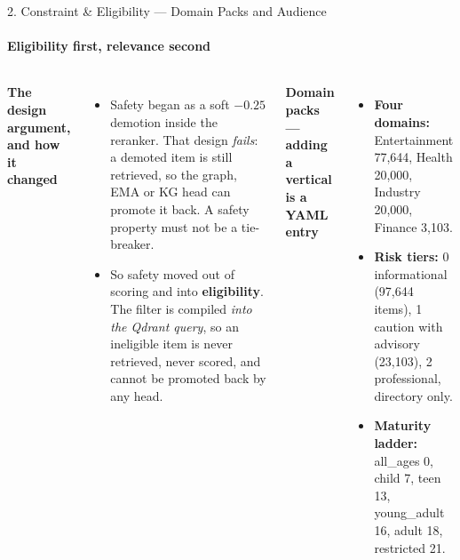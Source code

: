 \documentclass[aspectratio=169, 11pt]{beamer}
\newcommand{\eqs}{%
  \setlength{\abovedisplayskip}{3pt}%
  \setlength{\belowdisplayskip}{3pt}%
  \setlength{\abovedisplayshortskip}{2pt}%
  \setlength{\belowdisplayshortskip}{2pt}}
\newcommand{\blk}[1]{{\scriptsize\eqs\textbf{#1}}\par\vspace{0.9mm}}
\newenvironment{tight}{\begin{itemize}\scriptsize\setlength{\itemsep}{3.2pt}}{\end{itemize}}
\begin{document}
\begin{frame}[shrink]{2. Constraint \& Eligibility --- Domain Packs and Audience}
\framesubtitle{Eligibility first, relevance second}
\vspace{1mm}
\begin{columns}[T]
\blk{The design argument, and how it changed}
\begin{tight}
  \item Safety began as a soft $-0.25$ demotion inside the reranker. That design \emph{fails}: a
        demoted item is still retrieved, so the graph, EMA or KG head can promote it back. A
        safety property must not be a tie-breaker.
  \item So safety moved out of scoring and into \textbf{eligibility}. The filter is compiled
        \emph{into the Qdrant query}, so an ineligible item is never retrieved, never scored, and
        cannot be promoted back by any head.
\end{tight}
\vspace{2mm}
\blk{Domain packs --- adding a vertical is a YAML entry}
\begin{tight}
  \item \textbf{Four domains:} Entertainment 77{,}644, Health 20{,}000, Industry 20{,}000,
        Finance 3{,}103.
  \item \textbf{Risk tiers:} 0 informational (97{,}644 items), 1 caution with advisory (23{,}103),
        2 professional, directory only.
  \item \textbf{Maturity ladder:} all\_ages 0, child 7, teen 13, young\_adult 16, adult 18,
        restricted 21.
\end{tight}


\end{columns}
\end{frame}
\end{document}
